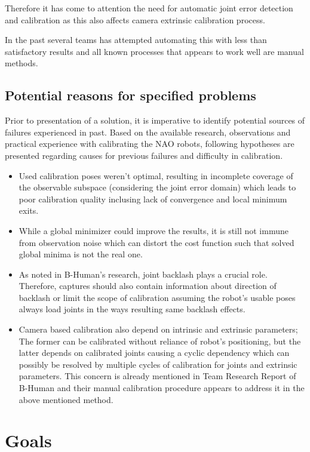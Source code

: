 \documentclass[english, printversion, nomenclature, notitle]{tuvisionthesis} %
\makeatletter
\renewcommand{\todo}[2][]{\tikzexternaldisable\@todo[#1]{#2}\tikzexternalenable}
\makeatother
\begin{document}
Therefore it has come to attention the need for automatic joint error detection and calibration as this also affects camera extrinsic calibration process.

In the past several teams has attempted automating this with less than satisfactory results and all known processes that appears to work well are manual methods. 

\subsection{Potential reasons for specified problems}
Prior to presentation of a solution, it is imperative to identify potential sources of failures experienced in past. Based on the available research, observations and practical experience with calibrating the NAO robots, following hypotheses are presented regarding causes for previous failures and difficulty in calibration.

\begin{itemize}
	\label{itemize:possible_reasons}
	\item Used calibration poses weren't optimal, resulting in incomplete coverage of the observable subspace (considering the joint error domain\todo{is this the right wording?}) which leads to poor calibration quality inclusing lack of convergence and local minimum exits.
	\item While a global minimizer could improve the results, it is still not immune from observation noise which can distort the cost function such that solved global minima is not the real one.
	\item As noted in B-Human's research, joint backlash plays a crucial role. Therefore, captures should also contain information about direction of backlash or limit the scope of calibration assuming the robot's usable poses always load joints in the ways resulting same backlash effects.
	\item Camera based calibration also depend on intrinsic and extrinsic parameters; The former can be calibrated without reliance of robot's positioning, but the latter depends on calibrated joints causing a cyclic dependency which can possibly be resolved by multiple cycles of calibration for joints and extrinsic parameters. This concern is already mentioned in Team Research Report of B-Human and their manual calibration procedure appears to address it in the above mentioned method.
\end{itemize}

\section{Goals}
\end{document}
